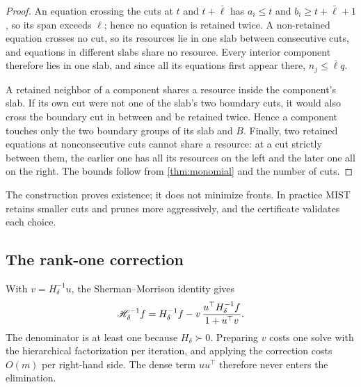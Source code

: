\begin{proof}
An equation crossing the cuts at $t$ and $t+\bar\ell$ has $a_i\le t$ and
$b_i\ge t+\bar\ell+1$, so its span exceeds $\ell$; hence no equation is retained
twice. A non-retained equation crosses no cut, so its resources lie in one slab
between consecutive cuts, and equations in different slabs share no resource.
Every interior component therefore lies in one slab, and since all its equations
first appear there, $n_j\le\bar\ell q$.

A retained neighbor of a component shares a resource inside the component's slab.
If its own cut were not one of the slab's two boundary cuts, it would also cross the
boundary cut in between and be retained twice. Hence a component touches only the
two boundary groups of its slab and $B$. Finally, two retained equations at
nonconsecutive cuts cannot share a resource: at a cut strictly between them, the
earlier one has all its resources on the left and the later one all on the right.
The bounds follow from \cref{thm:monomial} and the number of cuts.
\end{proof}

The construction proves existence; it does not minimize fronts. In practice MIST
retains smaller cuts and prunes more aggressively, and the certificate validates
each choice.

\subsection{The rank-one correction}\label{sec:rankone}

With $v=H_\delta^{-1}u$, the Sherman--Morrison identity gives
\begin{equation}\label{eq:sm}
\mathscr H_\delta^{-1}f=H_\delta^{-1}f-v\,\frac{u^\top H_\delta^{-1}f}{1+u^\top v}.
\end{equation}
The denominator is at least one because $H_\delta\succ0$. Preparing $v$ costs one
solve with the hierarchical factorization per iteration, and applying the
correction costs $O(m)$ per right-hand side. The dense term $uu^\top$ therefore
never enters the elimination.
